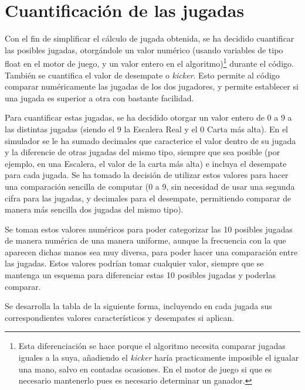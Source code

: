 \section {Cuantificación de las jugadas}
\label{sec:valmano}

Con el fin de simplificar el cálculo de jugada obtenida, se ha decidido cuantificar las posibles jugadas, otorgándole un valor numérico (usando variables de tipo float en el motor de juego, y un valor entero en el algoritmo)\footnote{Esta diferenciación se hace porque el algoritmo necesita comparar jugadas iguales a la suya, añadiendo el \textit{kicker} haría practicamente imposible el igualar una mano, salvo en contadas ocasiones. En el motor de juego si que es necesario mantenerlo pues es necesario determinar un ganador.} durante el código. También se cuantifica el valor de desempate o \textit{kicker}. Esto permite al código comparar numéricamente  las jugadas de los dos jugadores, y permite establecer si una jugada es superior a otra con bastante facilidad.

Para cuantificar estas jugadas, se ha decidido otorgar un valor entero de 0 a 9 a las distintas jugadas (siendo el 9 la Escalera Real y el 0 Carta más alta). En el simulador se le ha sumado decimales que caracterice el valor dentro de su jugada y la diferencie de otras jugadas del mismo tipo, siempre que sea posible (por ejemplo, en una Escalera, el valor de la carta más alta) e incluya el desempate para cada jugada.  Se ha tomado la decisión de utilizar estos valores para hacer una comparación sencilla de computar (0 a 9, sin necesidad de usar una segunda cifra para las jugadas, y decimales para el desempate, permitiendo comparar de manera más sencilla dos jugadas del mismo tipo).

Se toman estos valores numéricos para poder categorizar las 10 posibles jugadas de manera numérica de una manera uniforme, aunque la frecuencia con la que aparecen dichas manos sea muy diversa, para poder hacer una comparación entre las jugadas. Estos valores podrían tomar cualquier valor, siempre que se mantenga un esquema para diferenciar estas 10 posibles jugadas y poderlas comparar.

Se desarrolla la tabla de la siguiente forma, incluyendo en cada jugada sus correspondientes valores característicos y desempates si aplican.

